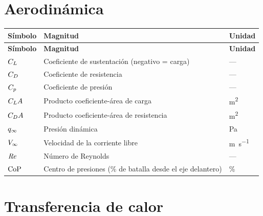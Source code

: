 \section*{Aerodinámica}

\begin{longtable}{@{}p{2.2cm}p{8.5cm}p{2.5cm}@{}}
\toprule
\textbf{Símbolo} & \textbf{Magnitud} & \textbf{Unidad} \\
\midrule
\endfirsthead
\toprule
\textbf{Símbolo} & \textbf{Magnitud} & \textbf{Unidad} \\
\midrule
\endhead
$C_L$    & Coeficiente de sustentación (negativo = carga)     & --- \\
$C_D$    & Coeficiente de resistencia                          & --- \\
$C_p$    & Coeficiente de presión                              & --- \\
$C_L A$   & Producto coeficiente-área de carga                  & \si{\meter\squared} \\
$C_D A$   & Producto coeficiente-área de resistencia            & \si{\meter\squared} \\
$q_{\infty}$  & Presión dinámica                                    & \si{\pascal} \\
$V_{\infty}$  & Velocidad de la corriente libre                     & \si{\meter\per\second} \\
$\mathit{Re}$   & Número de Reynolds                                  & --- \\
$\mathrm{CoP}$   & Centro de presiones (\% de batalla desde el eje delantero) & \si{\percent} \\
\bottomrule
\end{longtable}

\section*{Transferencia de calor}

